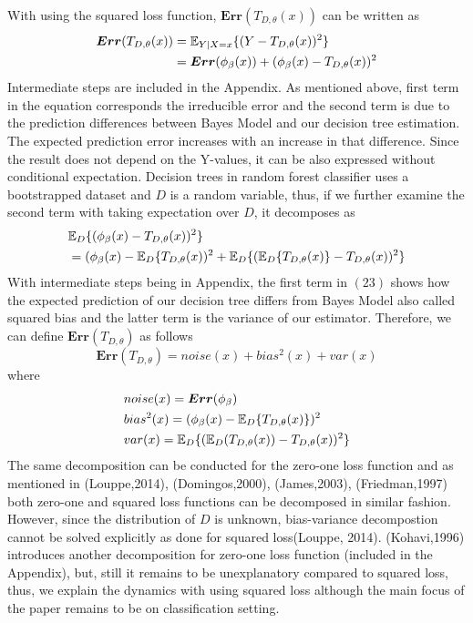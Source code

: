 With using the squared loss function, $\boldsymbol{Err}(T_{D,\theta}(x))$ can be written as
\begin{align}\label{eq:decomp_squared_loss}
\boldsymbol{Err}(T_{D, \theta}(x)) & = \mathbb{E}_{Y|X=x}\{(Y-T_{D,\theta}(x))^2\} \notag \\
							   	  & = \boldsymbol{Err}(\phi_{\beta}(x)) + (\phi_{\beta}(x)-T_{D,\theta}(x))^2
\end{align}
Intermediate steps are included in the Appendix. As mentioned above, first term in the equation corresponds the irreducible error and the second term is due to the prediction differences between Bayes Model and our decision tree estimation. The expected prediction error increases with an increase in that difference. Since the result does not depend on the Y-values, it can be also expressed without conditional expectation. Decision trees in random forest classifier uses a bootstrapped dataset and $D$ is a random variable, thus, if we further examine the second term with taking expectation over $D$, it decomposes as
\begin{align}\label{eq:decomp_squared_loss_cont}
& \mathbb{E}_{D}\{(\phi_{\beta}(x) - T_{D,\theta}(x))^2 \} \notag \\
&= (\phi_{\beta}(x) - \mathbb{E}_{D}\{T_{D,\theta}(x))^2 + \mathbb{E}_{D}\{(\mathbb{E}_{D}\{T_{D,\theta}(x)\} - T_{D,\theta}(x))^2\}
\end{align}
With intermediate steps being in Appendix, the first term in $(23)$ shows how the expected prediction of our decision tree differs from Bayes Model also called squared bias and the latter term is the variance of our estimator. Therefore, we can define $\boldsymbol{Err}(T_{D,\theta})$ as follows
\begin{equation}
\boldsymbol{Err}(T_{D,\theta}) = noise(x) + bias^2(x) + var(x)
\end{equation}
where
\begin{align}
& noise(x) = \boldsymbol{Err}(\phi_{\beta}) \notag \\
& bias^2(x) = (\phi_{\beta}(x) - \mathbb{E}_{D}\{T_{D,\theta}(x)\})^2 \notag \\
& var(x) = \mathbb{E}_{D}\{(\mathbb{E}_{D}(T_{D,\theta}(x)) - T_{D,\theta}(x))^2\} \notag
\end{align}
The same decomposition can be conducted for the zero-one loss function and as mentioned in (Louppe,2014), (Domingos,2000), (James,2003), (Friedman,1997) both zero-one and squared loss functions can be decomposed in similar fashion. However, since the distribution of $D$ is unknown, bias-variance decompostion cannot be solved explicitly as done for squared loss(Louppe, 2014). (Kohavi,1996) introduces another decomposition for zero-one loss function (included in the Appendix), but, still it remains to be unexplanatory compared to squared loss, thus, we explain the dynamics with using squared loss although the main focus of the paper remains to be on classification setting.

